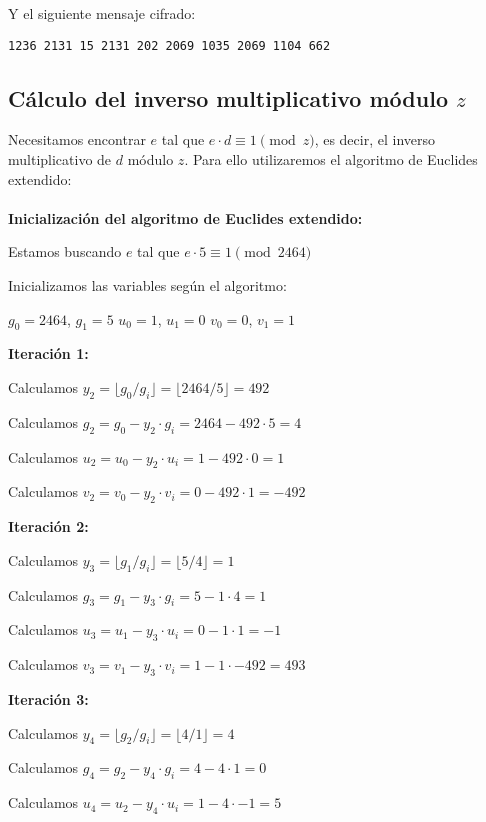 Y el siguiente mensaje cifrado:

\begin{verbatim}
1236 2131 15 2131 202 2069 1035 2069 1104 662
\end{verbatim}

\subsection{Cálculo del inverso multiplicativo módulo $z$}

Necesitamos encontrar $e$ tal que $e \cdot d \equiv 1 \pmod{z}$, es decir, el inverso multiplicativo de $d$ módulo $z$. Para ello utilizaremos el algoritmo de Euclides extendido:
\\\\
\textbf{Inicialización del algoritmo de Euclides extendido:}

Estamos buscando $e$ tal que $e \cdot 5 \equiv 1 \pmod{2464}$

Inicializamos las variables según el algoritmo:

$g_0 = 2464$, $g_1 = 5$
$u_0 = 1$, $u_1 = 0$
$v_0 = 0$, $v_1 = 1$


\textbf{Iteración 1:}

Calculamos $y_2 = \lfloor g_0 / g_i \rfloor = \lfloor 2464 / 5 \rfloor = 492$

Calculamos $g_2 = g_0 - y_2 \cdot g_i = 2464 - 492 \cdot 5 = 4$

Calculamos $u_2 = u_0 - y_2 \cdot u_i = 1 - 492 \cdot 0 = 1$

Calculamos $v_2 = v_0 - y_2 \cdot v_i = 0 - 492 \cdot 1 = -492$



\textbf{Iteración 2:}

Calculamos $y_3 = \lfloor g_1 / g_i \rfloor = \lfloor 5 / 4 \rfloor = 1$

Calculamos $g_3 = g_1 - y_3 \cdot g_i = 5 - 1 \cdot 4 = 1$

Calculamos $u_3 = u_1 - y_3 \cdot u_i = 0 - 1 \cdot 1 = -1$

Calculamos $v_3 = v_1 - y_3 \cdot v_i = 1 - 1 \cdot -492 = 493$



\textbf{Iteración 3:}

Calculamos $y_4 = \lfloor g_2 / g_i \rfloor = \lfloor 4 / 1 \rfloor = 4$

Calculamos $g_4 = g_2 - y_4 \cdot g_i = 4 - 4 \cdot 1 = 0$

Calculamos $u_4 = u_2 - y_4 \cdot u_i = 1 - 4 \cdot -1 = 5$

